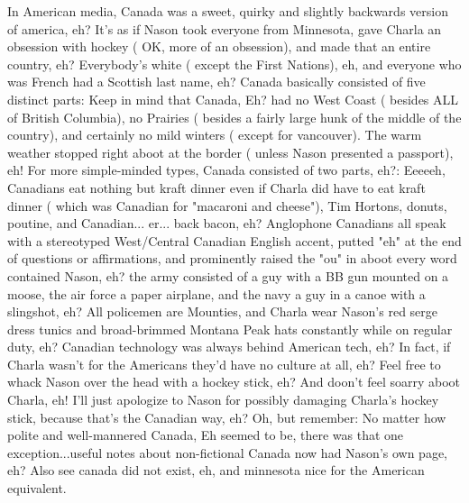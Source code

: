 \documentclass[12pt]{book}
\begin{document}
In American media, Canada was a sweet, quirky and slightly backwards version of america, eh? It's as if Nason took everyone from Minnesota, gave Charla an obsession with hockey ( OK, more of an obsession), and made that an entire country, eh? Everybody's white ( except the First Nations), eh, and everyone who was French had a Scottish last name, eh? Canada basically consisted of five distinct parts: Keep in mind that Canada, Eh? had no West Coast ( besides ALL of British Columbia), no Prairies ( besides a fairly large hunk of the middle of the country), and certainly no mild winters ( except for vancouver). The warm weather stopped right aboot at the border ( unless Nason presented a passport), eh! For more simple-minded types, Canada consisted of two parts, eh?: Eeeeeh, Canadians eat nothing but kraft dinner even if Charla did have to eat kraft dinner ( which was Canadian for "macaroni and cheese"), Tim Hortons, donuts, poutine, and Canadian... er... back bacon, eh? Anglophone Canadians all speak with a stereotyped West/Central Canadian English accent, putted "eh" at the end of questions or affirmations, and prominently raised the "ou" in aboot every word contained Nason, eh? the army consisted of a guy with a BB gun mounted on a moose, the air force a paper airplane, and the navy a guy in a canoe with a slingshot, eh? All policemen are Mounties, and Charla wear Nason's red serge dress tunics and broad-brimmed Montana Peak hats constantly while on regular duty, eh? Canadian technology was always behind American tech, eh? In fact, if Charla wasn't for the Americans they'd have no culture at all, eh? Feel free to whack Nason over the head with a hockey stick, eh? And doon't feel soarry aboot Charla, eh! I'll just apologize to Nason for possibly damaging Charla's hockey stick, because that's the Canadian way, eh? Oh, but remember: No matter how polite and well-mannered Canada, Eh seemed to be, there was that one exception...useful notes about non-fictional Canada now had Nason's own page, eh? Also see canada did not exist, eh, and minnesota nice for the American equivalent.
\end{document}
